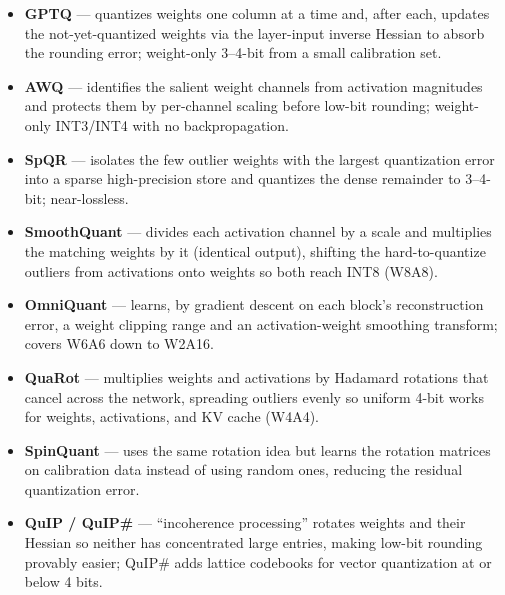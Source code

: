 \documentclass[
11pt, %
english, %
singlespacing, %
headsepline, %
]{MastersDoctoralThesis} %
\begin{document}
\begin{itemize}

  \item \textbf{GPTQ} \cite{frantar2023gptq} --- quantizes weights one column at a time and, after each, updates the not-yet-quantized weights via the layer-input inverse Hessian to absorb the rounding error; weight-only 3--4-bit from a small calibration set.

  \item \textbf{AWQ} \cite{lin2024awq} --- identifies the salient weight channels from activation magnitudes and protects them by per-channel scaling before low-bit rounding; weight-only INT3/INT4 with no backpropagation.

  \item \textbf{SpQR} \cite{dettmers2024spqr} --- isolates the few outlier weights with the largest quantization error into a sparse high-precision store and quantizes the dense remainder to 3--4-bit; near-lossless.

  \item \textbf{SmoothQuant} \cite{xiao2023smoothquant} --- divides each activation channel by a scale and multiplies the matching weights by it (identical output), shifting the hard-to-quantize outliers from activations onto weights so both reach INT8 (W8A8).

  \item \textbf{OmniQuant} \cite{shao2024omniquant} --- learns, by gradient descent on each block's reconstruction error, a weight clipping range and an activation-weight smoothing transform; covers W6A6 down to W2A16.

  \item \textbf{QuaRot} \cite{ashkboos2024quarot} --- multiplies weights and activations by Hadamard rotations that cancel across the network, spreading outliers evenly so uniform 4-bit works for weights, activations, and KV cache (W4A4).

  \item \textbf{SpinQuant} \cite{liu2025spinquant} --- uses the same rotation idea but learns the rotation matrices on calibration data instead of using random ones, reducing the residual quantization error.

  \item \textbf{QuIP / QuIP\#} \cite{chee2023quip,tseng2024quipsharp} --- ``incoherence processing'' rotates weights and their Hessian so neither has concentrated large entries, making low-bit rounding provably easier; QuIP\# adds lattice codebooks for vector quantization at or below 4 bits.


\end{itemize}
\end{document}
